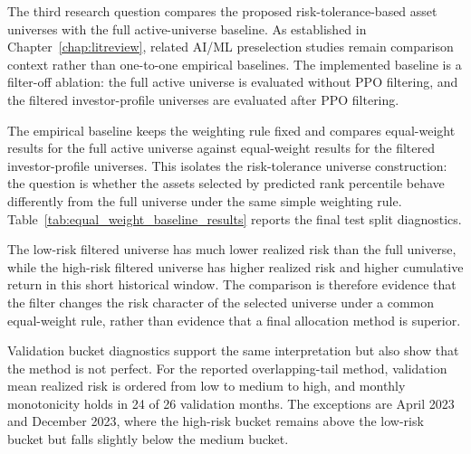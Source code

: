 The third research question compares the proposed risk-tolerance-based asset universes with the full active-universe baseline. As established in Chapter~\ref{chap:litreview}, related AI/ML preselection studies remain comparison context rather than one-to-one empirical baselines. The implemented baseline is a filter-off ablation: the full active universe is evaluated without PPO filtering, and the filtered investor-profile universes are evaluated after PPO filtering.

The empirical baseline keeps the weighting rule fixed and compares equal-weight results for the full active universe against equal-weight results for the filtered investor-profile universes. This isolates the risk-tolerance universe construction: the question is whether the assets selected by predicted rank percentile behave differently from the full universe under the same simple weighting rule. Table~\ref{tab:equal_weight_baseline_results} reports the final test split diagnostics.

\begin{table}[H]
\centering
\scriptsize
\caption{Equal-weight full-universe and filtered-universe diagnostics on the final test split}
\label{tab:equal_weight_baseline_results}
\end{table}

The low-risk filtered universe has much lower realized risk than the full universe, while the high-risk filtered universe has higher realized risk and higher cumulative return in this short historical window. The comparison is therefore evidence that the filter changes the risk character of the selected universe under a common equal-weight rule, rather than evidence that a final allocation method is superior.

Validation bucket diagnostics support the same interpretation but also show that the method is not perfect. For the reported overlapping-tail method, validation mean realized risk is ordered from low to medium to high, and monthly monotonicity holds in 24 of 26 validation months. The exceptions are April 2023 and December 2023, where the high-risk bucket remains above the low-risk bucket but falls slightly below the medium bucket.


